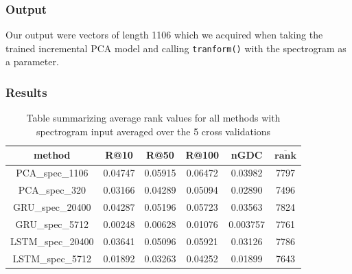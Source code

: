 \subsubsection{Output}
Our output were vectors of length 1106 which we acquired when taking the trained incremental PCA model and calling \texttt{tranform()} with the spectrogram as a parameter.

\subsubsection{Results}

\begin{table}[h]
\centering
\renewcommand{\arraystretch}{1.5}
\begin{tabu} to 1\textwidth { | c || c | c | c | c | c |}
 \hline
 \textbf{method} & \textbf{R@10} & \textbf{R@50} & \textbf{R@100} & \textbf{nGDC} & $ \boldsymbol{\overline{rank}} $ \\
 \hline
 \hline
 PCA\_spec\_1106 & 0.04747 & 0.05915 &  0.06472 & 0.03982 & 7797 \\
 \hline
 PCA\_spec\_320 & 0.03166 & 0.04289 &  0.05094 & 0.02890 & 7496 \\
 \hline
 GRU\_spec\_20400 & 0.04287 & 0.05196 & 0.05723 & 0.03563 & 7824 \\
 \hline
 GRU\_spec\_5712 & 0.00248 & 0.00628 & 0.01076 & 0.003757 & 7761 \\
 \hline
 LSTM\_spec\_20400 & 0.03641 & 0.05096 & 0.05921 & 0.03126 & 7786 \\
 \hline
 LSTM\_spec\_5712 & 0.01892 & 0.03263 & 0.04252 &  0.01899 & 7643 \\
 \hline
\end{tabu} \\
\caption{Table summarizing average rank values for all methods with spectrogram input averaged over the 5 cross validations}
\label{table:spec_methods}
\end{table}
 

